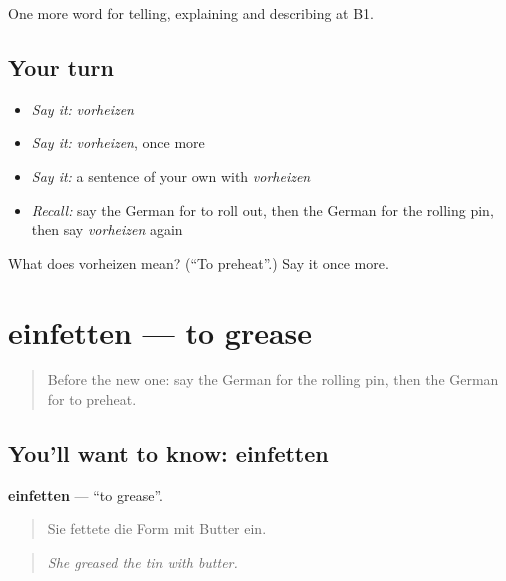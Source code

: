 \begin{grammarlens}[title={What you've built}]
One more word for telling, explaining and describing at B1.
\end{grammarlens}

\subsection*{Your turn}
\begin{itemize}
\raggedright
  \item \emph{Say it:} \emph{vorheizen}
  \item \emph{Say it:} \emph{vorheizen}, once more
  \item \emph{Say it:} a sentence of your own with \emph{vorheizen}
  \item \emph{Recall:} say the German for to roll out, then the German for the rolling pin, then say \emph{vorheizen} again
\end{itemize}

\begin{tcolorbox}[breakable,colback=teal!4,colframe=teal!35!black,title={Before you move on}]
What does vorheizen mean? (\textquotedblleft{}To preheat\textquotedblright{}.) Say it once more.
\end{tcolorbox}
\section[einfetten]{einfetten — to grease}

\label{lesson:GE-C326-einfetten}



\begin{quote}
Before the new one: say the German for the rolling pin, then the German for to preheat.
\end{quote}

\subsection*{You'll want to know: einfetten}
\textbf{einfetten} — \textquotedblleft{}to grease\textquotedblright{}.

\begin{quote}
Sie fettete die Form mit Butter ein.
\end{quote}

\begin{quote}
\emph{She greased the tin with butter.}
\end{quote}

